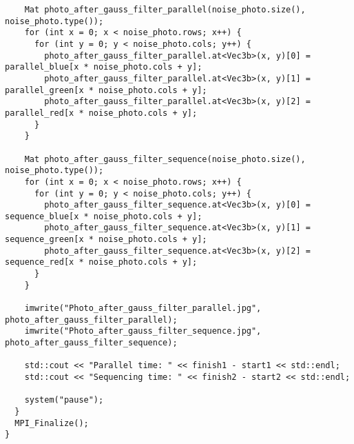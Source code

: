 \documentclass{report}
\begin{document}
\begin{lstlisting}
    Mat photo_after_gauss_filter_parallel(noise_photo.size(), noise_photo.type());
    for (int x = 0; x < noise_photo.rows; x++) {
      for (int y = 0; y < noise_photo.cols; y++) {
        photo_after_gauss_filter_parallel.at<Vec3b>(x, y)[0] = parallel_blue[x * noise_photo.cols + y];
        photo_after_gauss_filter_parallel.at<Vec3b>(x, y)[1] = parallel_green[x * noise_photo.cols + y];
        photo_after_gauss_filter_parallel.at<Vec3b>(x, y)[2] = parallel_red[x * noise_photo.cols + y];
      }
    }

    Mat photo_after_gauss_filter_sequence(noise_photo.size(), noise_photo.type());
    for (int x = 0; x < noise_photo.rows; x++) {
      for (int y = 0; y < noise_photo.cols; y++) {
        photo_after_gauss_filter_sequence.at<Vec3b>(x, y)[0] = sequence_blue[x * noise_photo.cols + y];
        photo_after_gauss_filter_sequence.at<Vec3b>(x, y)[1] = sequence_green[x * noise_photo.cols + y];
        photo_after_gauss_filter_sequence.at<Vec3b>(x, y)[2] = sequence_red[x * noise_photo.cols + y];
      }
    }

    imwrite("Photo_after_gauss_filter_parallel.jpg", photo_after_gauss_filter_parallel);
    imwrite("Photo_after_gauss_filter_sequence.jpg", photo_after_gauss_filter_sequence);

    std::cout << "Parallel time: " << finish1 - start1 << std::endl;
    std::cout << "Sequencing time: " << finish2 - start2 << std::endl;

    system("pause");
  }
  MPI_Finalize();
}

\end{lstlisting}
\end{document}
